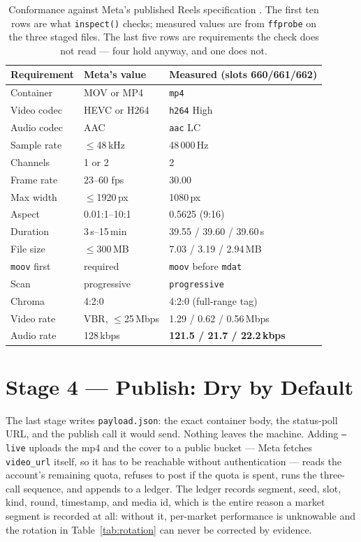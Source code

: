 \documentclass[10pt,letterpaper,twocolumn]{article}
\newcommand{\code}[1]{\texttt{#1}}
\begin{document}
\begin{table}[!t]
\centering
\caption{Conformance against Meta's published Reels specification
\cite{metaMedia}. The first ten rows are what \code{inspect()} checks; measured
values are from \code{ffprobe} on the three staged files. The last five rows are
requirements the check does not read --- four hold anyway, and one does not.}
\label{tab:spec}
\footnotesize
\begin{tabularx}{\columnwidth}{@{}P{0.20\columnwidth}P{0.24\columnwidth}L@{}}
\toprule
Requirement & Meta's value & Measured (slots 660/661/662) \\
\midrule
Container & MOV or MP4 & \code{mp4} \\
Video codec & HEVC or H264 & \code{h264} High \\
Audio codec & AAC & \code{aac} LC \\
Sample rate & $\leq$48\,kHz & 48\,000\,Hz \\
Channels & 1 or 2 & 2 \\
Frame rate & 23--60 fps & 30.00 \\
Max width & $\leq$1920\,px & 1080\,px \\
Aspect & 0.01{:}1--10{:}1 & 0.5625 (9{:}16) \\
Duration & 3\,s--15\,min & 39.55 / 39.60 / 39.60\,s \\
File size & $\leq$300\,MB & 7.03 / 3.19 / 2.94\,MB \\
\midrule
\code{moov} first & required & \code{moov} before \code{mdat} \\
Scan & progressive & \code{progressive} \\
Chroma & 4:2:0 & 4:2:0 (full-range tag) \\
Video rate & VBR, $\leq$25\,Mbps & 1.29 / 0.62 / 0.56\,Mbps \\
Audio rate & 128\,kbps & \textbf{121.5 / 21.7 / 22.2\,kbps} \\
\bottomrule
\end{tabularx}
\end{table}

\section{Stage 4 --- Publish: Dry by Default}

The last stage writes \code{payload.json}: the exact container body, the
status-poll URL, and the publish call it would send. Nothing leaves the machine.
Adding \code{--live} uploads the mp4 and the cover to a public bucket --- Meta
fetches \code{video\_url} itself, so it has to be reachable without
authentication --- reads the account's remaining quota, refuses to post if the
quota is spent, runs the three-call sequence, and appends to a ledger. The
ledger records segment, seed, slot, kind, round, timestamp, and media id, which
is the entire reason a market segment is recorded at all: without it, per-market
performance is unknowable and the rotation in Table~\ref{tab:rotation} can never
be corrected by evidence.
\end{document}

